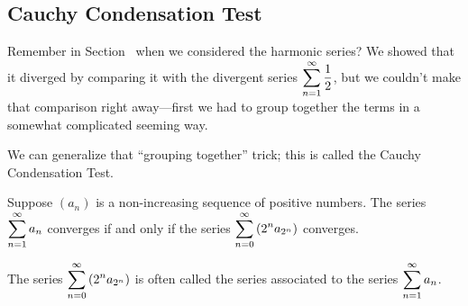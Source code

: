 \subsection{Cauchy Condensation Test}


Remember in Section~ when we considered
the harmonic series?  We showed that it diverged by comparing it with
the divergent series $\displaystyle\sum_{n=1}^\infty \frac{1}{2}$, but we
couldn't make that comparison right away---first we had to group
together the terms in a somewhat complicated seeming way.  

We can generalize that ``grouping together'' trick; this is called the
Cauchy Condensation Test.

\begin{theorem}\label{thm:cauchy-condensation}
Suppose $(a_n)$ is a non-increasing sequence of positive numbers.  The series
$\displaystyle\sum_{n=1}^\infty a_n$ converges if and only if the series $\displaystyle\sum_{n=0}^\infty \left( 2^n a_{2^n} \right)$ converges.
\end{theorem}

The series $\displaystyle\sum_{n=0}^\infty \left( 2^n a_{2^n} \right)$ is often
called the  series associated to the series
$\displaystyle\sum_{n=1}^\infty a_n$.

